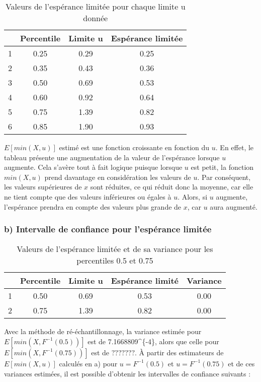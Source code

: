 \documentclass[]{article}
\begin{document}
\begin{table}[ht]
\centering
\begin{tabular}{cccc}
  \hline
 & Percentile & Limite u & Espérance limitée \\ 
  \hline
1 & 0.25 & 0.29 & 0.25 \\ 
  2 & 0.35 & 0.43 & 0.36 \\ 
  3 & 0.50 & 0.69 & 0.53 \\ 
  4 & 0.60 & 0.92 & 0.64 \\ 
  5 & 0.75 & 1.39 & 0.82 \\ 
  6 & 0.85 & 1.90 & 0.93 \\ 
   \hline
\end{tabular}
\caption{Valeurs de l'espérance limitée pour chaque limite u donnée} 
\end{table}

\(E[min(X,u)]\) estimé est une fonction croissante en fonction du \(u\).
En effet, le tableau présente une augmentation de la valeur de
l'espérance lorsque \(u\) augmente. Cela s'avère tout à fait logique
puisque lorsque \(u\) est petit, la fonction \(min(X,u)\) prend
davantage en considération les valeurs de \(u\). Par conséquent, les
valeurs supérieures de \(x\) sont réduites, ce qui réduit donc la
moyenne, car elle ne tient compte que des valeurs inférieures ou égales
à \(u\). Alors, si \(u\) augmente, l'espérance prendra en compte des
valeurs plus grande de \(x\), car \(u\) aura augmenté.

\subsubsection{b) Intervalle de confiance pour l'espérance
limitée}\label{b-intervalle-de-confiance-pour-lesperance-limitee}

\begin{table}[ht]
\centering
\begin{tabular}{ccccc}
  \hline
 & Percentile & Limite u & Espérance limité & Variance \\ 
  \hline
1 & 0.50 & 0.69 & 0.53 & 0.00 \\ 
  2 & 0.75 & 1.39 & 0.82 & 0.00 \\ 
   \hline
\end{tabular}
\caption{Valeurs de l'espérance limitée et de sa variance pour les percentiles 0.5 et 0.75} 
\end{table}

Avec la méthode de ré-échantillonnage, la variance estimée pour
\(E[min(X,F^{-1}(0.5))]\) est de 7.1668809\^{}\{-4\}, alors que
celle pour \(E[min(X,F^{-1}(0.75))]\) est de \(???????\). À partir des
estimateurs de \(E[min(X,u)]\) calculés en a) pour \(u = F^{-1}(0.5)\)
et \(u = F^{-1}(0.75)\) et de ces variances estimées, il est possible
d'obtenir les intervalles de confiance suivants :
\end{document}
